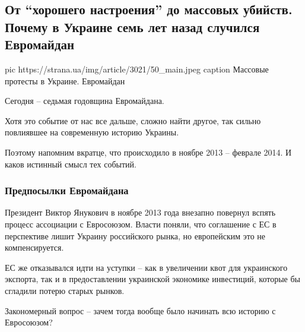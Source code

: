  
 
 
 
 
 
\subsection{От \enquote{хорошего настроения} до массовых убийств. Почему в Украине семь лет назад случился Евромайдан}
\label{sec:21_11_2020.news.ua.strana.1.maidan_7_let}

\ifcmt
pic https://strana.ua/img/article/3021/50_main.jpeg
caption Массовые протесты в Украине. Евромайдан 
\fi

Сегодня – седьмая годовщина Евромайдана.

Хотя это событие от нас все дальше, сложно найти другое, так сильно
повлиявшее на современную историю Украины.

Поэтому напомним вкратце, что происходило в ноябре 2013 – феврале 2014. И
каков истинный смысл тех событий.

\subsubsection{Предпосылки Евромайдана}

Президент Виктор Янукович в ноябре 2013 года внезапно повернул вспять процесс
ассоциации с Евросоюзом. Власти поняли, что соглашение с ЕС в перспективе лишит
Украину российского рынка, но европейским это не компенсируется.

ЕС же отказывался идти на уступки – как в увеличении квот для украинского
экспорта, так и в предоставлении украинской экономике инвестиций, которые бы
сгладили потерю старых рынков.

Закономерный вопрос – зачем тогда вообще было начинать всю историю с
Евросоюзом?

